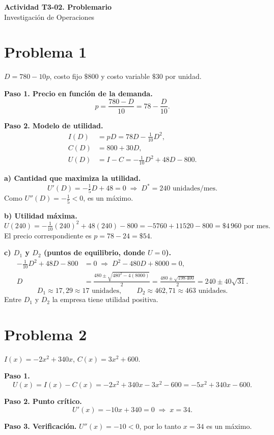 \documentclass[12pt,letterpaper]{article}
\begin{document}
\begin{center}
{\Large\textbf{Actividad T3-02. Problemario}}\\[2pt]
Investigación de Operaciones
\end{center}

\section*{Problema 1}
$D=780-10p$, costo fijo $\$800$ y costo variable $\$30$ por unidad.

\textbf{Paso 1. Precio en función de la demanda.}
\[ p=\frac{780-D}{10}=78-\frac{D}{10}. \]

\textbf{Paso 2. Modelo de utilidad.}
\begin{align*}
I(D)&=pD=78D-\tfrac{1}{10}D^2,\\
C(D)&=800+30D,\\
U(D)&=I-C=-\tfrac{1}{10}D^2+48D-800.
\end{align*}

\textbf{a) Cantidad que maximiza la utilidad.}
\[ U'(D)=-\tfrac{1}{5}D+48=0 \;\Rightarrow\; D^*=240\text{ unidades/mes}. \]
Como $U''(D)=-\tfrac15<0$, es un máximo.

\textbf{b) Utilidad máxima.}
\[ U(240)=-\tfrac{1}{10}(240)^2+48(240)-800=-5760+11520-800=\$4\,960\text{ por mes}. \]
El precio correspondiente es $p=78-24=\$54$.

\textbf{c) $D_1$ y $D_2$ (puntos de equilibrio, donde $U=0$).}
\begin{align*}
-\tfrac{1}{10}D^2+48D-800&=0 \;\Rightarrow\; D^2-480D+8000=0,\\
D&=\frac{480\pm\sqrt{480^2-4(8000)}}{2}=\frac{480\pm\sqrt{198\,400}}{2}=240\pm40\sqrt{31}.
\end{align*}
\[ D_1\approx 17{,}29\approx 17\text{ unidades},\qquad D_2\approx 462{,}71\approx 463\text{ unidades}. \]
Entre $D_1$ y $D_2$ la empresa tiene utilidad positiva.

\section*{Problema 2}
$I(x)=-2x^2+340x$, $C(x)=3x^2+600$.

\textbf{Paso 1.}
\[ U(x)=I(x)-C(x)=-2x^2+340x-3x^2-600=-5x^2+340x-600. \]

\textbf{Paso 2. Punto crítico.}
\[ U'(x)=-10x+340=0\;\Rightarrow\;x=34. \]

\textbf{Paso 3. Verificación.} $U''(x)=-10<0$, por lo tanto $x=34$ es un máximo.
\end{document}
